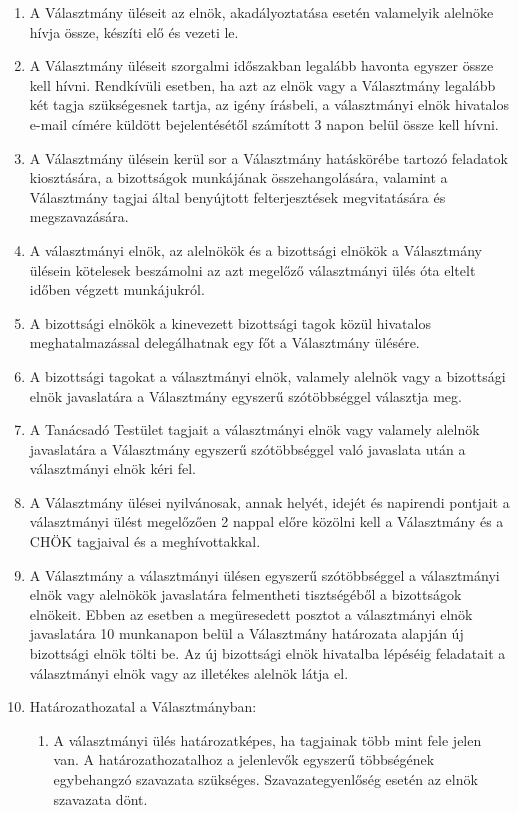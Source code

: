 \documentclass{rulebook}
\begin{document}
\begin{enumerate}
	\item A Választmány üléseit az elnök, akadályoztatása esetén valamelyik alelnöke hívja össze, készíti elő és vezeti le.
	\item A Választmány üléseit szorgalmi időszakban legalább havonta egyszer össze kell hívni. Rendkívüli esetben, ha azt az elnök vagy a Választmány legalább két tagja szükségesnek tartja, az igény írásbeli, a választmányi elnök hivatalos e-mail címére küldött bejelentésétől számított 3 napon belül össze kell hívni.
	\item A Választmány ülésein kerül sor a Választmány hatáskörébe tartozó feladatok kiosztására, a bizottságok munkájának összehangolására, valamint a Választmány tagjai által benyújtott felterjesztések megvitatására és megszavazására.
	\item A választmányi elnök, az alelnökök és a bizottsági elnökök a Választmány ülésein kötelesek beszámolni az azt megelőző választmányi ülés óta eltelt időben végzett munkájukról.
	\item A bizottsági elnökök a kinevezett bizottsági tagok közül hivatalos meghatalmazással delegálhatnak egy főt a Választmány ülésére.
	\item A bizottsági tagokat a választmányi elnök, valamely alelnök vagy a bizottsági elnök javaslatára a Választmány egyszerű szótöbbséggel választja meg.
	\item A Tanácsadó Testület tagjait a választmányi elnök vagy valamely alelnök javaslatára a Választmány egyszerű szótöbbséggel való javaslata után a választmányi elnök kéri fel.
	\item A Választmány ülései nyilvánosak, annak helyét, idejét és napirendi pontjait a választmányi ülést megelőzően 2 nappal előre közölni kell a Választmány és a CHÖK tagjaival és a meghívottakkal.
	\item A Választmány a választmányi ülésen egyszerű szótöbbséggel a választmányi elnök vagy alelnökök javaslatára felmentheti tisztségéből a bizottságok elnökeit. Ebben az esetben a megüresedett posztot a választmányi elnök javaslatára 10 munkanapon belül a Választmány határozata alapján új bizottsági elnök tölti be. Az új bizottsági elnök hivatalba lépéséig feladatait a választmányi elnök vagy az illetékes alelnök látja el.
	\item Határozathozatal a Választmányban:
	\begin{enumerate}
		\item A választmányi ülés határozatképes, ha tagjainak több mint fele jelen van. A határozathozatalhoz a jelenlevők egyszerű többségének egybehangzó szavazata szükséges. Szavazategyenlőség esetén az elnök szavazata dönt.

\end{enumerate}
\end{enumerate}
\end{document}
